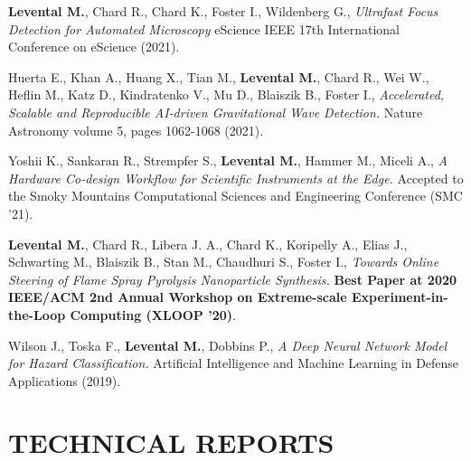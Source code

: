 \documentclass[11pt,letterpaper,roman,colorlinks,linkcolor=blue]{moderncv}
\newcommand*{\modern}{\fontfamily{qhv}\selectfont}
\newcommand{\mystyle}[1]{\textcolor{mygrey}{\modern #1}}
\newcommand{\mysectionstyle}[1]{\large\mystyle{#1}}
\begin{document}
\begin{hangingpar}
\textbf{Levental M.}, Chard R., Chard K., Foster I., Wildenberg G.,
\textit{Ultrafast Focus Detection for Automated Microscopy} 
eScience IEEE 17th International Conference on eScience (2021).
\end{hangingpar}


\begin{hangingpar}
Huerta E., Khan A., Huang X., Tian M., \textbf{Levental M.}, Chard R., Wei W., Heflin M., Katz D., Kindratenko V., Mu D., Blaiszik B., Foster I.,
\textit{Accelerated, Scalable and Reproducible AI-driven Gravitational Wave Detection.} 
Nature Astronomy volume 5, pages 1062-1068 (2021).
\end{hangingpar}

\begin{hangingpar}
Yoshii K., Sankaran R., Strempfer S., \textbf{Levental M.}, Hammer M., Miceli A.,
\textit{A Hardware Co-design Workflow for Scientific Instruments at the Edge.} 
Accepted to the Smoky Mountains Computational Sciences and Engineering Conference (SMC '21).
\end{hangingpar}

\begin{hangingpar}
\textbf{Levental M.}, Chard R., Libera J. A., Chard K., Koripelly A., Elias J., Schwarting M., Blaiszik B., Stan M., Chaudhuri S., Foster I.,
\textit{Towards Online Steering of Flame Spray Pyrolysis Nanoparticle Synthesis.} 
\textbf{Best Paper at 2020 IEEE/ACM 2nd Annual Workshop on Extreme-scale Experiment-in-the-Loop Computing (XLOOP '20)}.
\end{hangingpar}

\begin{hangingpar}
Wilson J., Toska F., \textbf{Levental M.}, Dobbins P.,
\textit{A Deep Neural Network Model for Hazard Classification.}
Artificial Intelligence and Machine Learning in Defense Applications (2019).
\end{hangingpar}

\section{\mysectionstyle{TECHNICAL REPORTS}}
\end{document}
